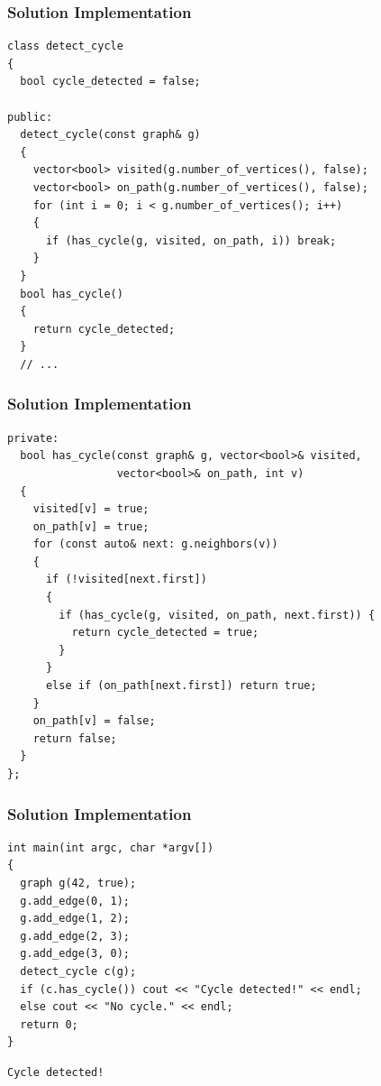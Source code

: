 \documentclass{beamer}
\begin{document}
\begin{frame}[containsverbatim]
\frametitle{Solution Implementation}

\scriptsize
\begin{lstlisting}
class detect_cycle
{
  bool cycle_detected = false;

public:
  detect_cycle(const graph& g)
  {
    vector<bool> visited(g.number_of_vertices(), false);
    vector<bool> on_path(g.number_of_vertices(), false);
    for (int i = 0; i < g.number_of_vertices(); i++)
    {
      if (has_cycle(g, visited, on_path, i)) break;
    }
  }
  bool has_cycle()
  {
    return cycle_detected;
  }
  // ...
\end{lstlisting}

\end{frame}

\begin{frame}[containsverbatim]
\frametitle{Solution Implementation}

\scriptsize
\begin{lstlisting}
private:
  bool has_cycle(const graph& g, vector<bool>& visited,
                 vector<bool>& on_path, int v)
  {
    visited[v] = true;
    on_path[v] = true;
    for (const auto& next: g.neighbors(v))
    {
      if (!visited[next.first])
      {
        if (has_cycle(g, visited, on_path, next.first)) {
          return cycle_detected = true;
        }
      }
      else if (on_path[next.first]) return true;
    }
    on_path[v] = false;
    return false;
  }
};
\end{lstlisting}

\end{frame}

\begin{frame}[containsverbatim]
\frametitle{Solution Implementation}

\scriptsize
\begin{lstlisting}
int main(int argc, char *argv[])
{
  graph g(42, true);
  g.add_edge(0, 1);
  g.add_edge(1, 2);
  g.add_edge(2, 3);
  g.add_edge(3, 0);
  detect_cycle c(g);
  if (c.has_cycle()) cout << "Cycle detected!" << endl;
  else cout << "No cycle." << endl;
  return 0;
}
\end{lstlisting}

\begin{verbatim}
Cycle detected!
\end{verbatim}

\end{frame}

\fi
\end{document}

